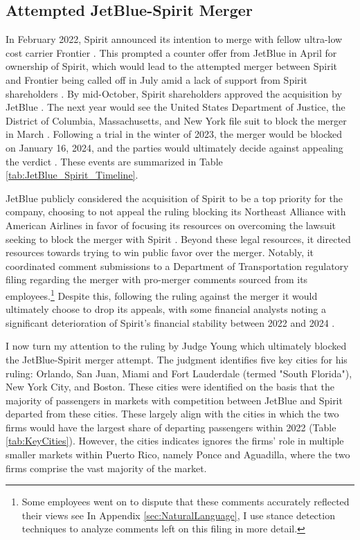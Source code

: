 \documentclass{article}
\let\Oldsubsection\subsection
\renewcommand{\subsection}{\FloatBarrier\Oldsubsection}
\begin{document}
	\subsection{Attempted JetBlue-Spirit Merger}
	\label{sec:Setting_Merger}
	In February 2022, Spirit announced its intention to merge with fellow ultra-low cost carrier Frontier \citep{schaper_frontier-spirit_2022}. This prompted a counter offer from JetBlue in April for ownership of Spirit, which would lead to the attempted merger between Spirit and Frontier being called off in July amid a lack of support from Spirit shareholders \citep{josephs_jetblue_2022, josephs_spirit_2022}. By mid-October, Spirit shareholders approved the acquisition by JetBlue \citep{koenig_spirit_2022}. The next year would see the United States Department of Justice, the District of Columbia, Massachusetts, and New York file suit to block the merger in March \citep{chokshi_justice_2023}. Following a trial in the winter of 2023, the merger would be blocked on January 16, 2024, and the parties would ultimately decide against appealing the verdict \citep{chapman_jetblue_2024}.  These events are summarized in Table \ref{tab:JetBlue_Spirit_Timeline}. 
	
	JetBlue publicly considered the acquisition of Spirit to be a top priority for the company, choosing to not appeal the ruling blocking its Northeast Alliance with American Airlines in favor of focusing its resources on overcoming the lawsuit seeking to block the merger with Spirit \citep{aratani_jetblue_2023}. Beyond these legal resources, it directed resources towards trying to win public favor over the merger. Notably, it coordinated comment submissions to a Department of Transportation regulatory filing regarding the merger with pro-merger comments sourced from its employees.\footnote{Some employees went on to dispute that these comments accurately reflected their views see \citet{birnbaum_elizabeth_2023, birnbaum_jet-blue_2023} In Appendix \ref{sec:NaturalLanguage}, I use stance detection techniques to analyze comments left on this filing in more detail.} Despite this, following the ruling against the merger it would ultimately choose to drop its appeals, with some financial analysts noting a significant deterioration of Spirit's financial stability between 2022 and 2024 \citep{sider_jetblue_2024}. 
	
	I now turn my attention to the ruling by Judge Young which ultimately blocked the JetBlue-Spirit merger attempt. The judgment identifies five key cities for his ruling: Orlando, San Juan, Miami and Fort Lauderdale (termed "South Florida"), New York City, and Boston. These cities were identified on the basis that the majority of passengers in markets with competition between JetBlue and Spirit departed from these cities. These largely align with the cities in which the two firms would have the largest share of departing passengers within 2022 (Table \ref{tab:KeyCities}). However, the cities indicates ignores the firms' role in multiple smaller markets within Puerto Rico, namely Ponce and Aguadilla, where the two firms comprise the vast majority of the market. 
	
\end{document}
